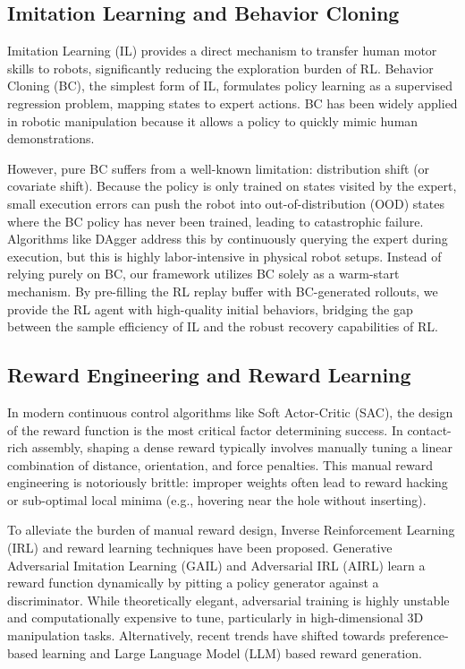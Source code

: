 \documentclass[conference]{IEEEtran}
\begin{document}
\subsection{Imitation Learning and Behavior Cloning}
Imitation Learning (IL) provides a direct mechanism to transfer human motor skills to robots, significantly reducing the exploration burden of RL. Behavior Cloning (BC), the simplest form of IL, formulates policy learning as a supervised regression problem, mapping states to expert actions. BC has been widely applied in robotic manipulation because it allows a policy to quickly mimic human demonstrations.

However, pure BC suffers from a well-known limitation: distribution shift (or covariate shift). Because the policy is only trained on states visited by the expert, small execution errors can push the robot into out-of-distribution (OOD) states where the BC policy has never been trained, leading to catastrophic failure. Algorithms like DAgger address this by continuously querying the expert during execution, but this is highly labor-intensive in physical robot setups. Instead of relying purely on BC, our framework utilizes BC solely as a warm-start mechanism. By pre-filling the RL replay buffer with BC-generated rollouts, we provide the RL agent with high-quality initial behaviors, bridging the gap between the sample efficiency of IL and the robust recovery capabilities of RL.

\subsection{Reward Engineering and Reward Learning}
In modern continuous control algorithms like Soft Actor-Critic (SAC), the design of the reward function is the most critical factor determining success. In contact-rich assembly, shaping a dense reward typically involves manually tuning a linear combination of distance, orientation, and force penalties. This manual reward engineering is notoriously brittle: improper weights often lead to reward hacking or sub-optimal local minima (e.g., hovering near the hole without inserting).

To alleviate the burden of manual reward design, Inverse Reinforcement Learning (IRL) and reward learning techniques have been proposed. Generative Adversarial Imitation Learning (GAIL) and Adversarial IRL (AIRL) learn a reward function dynamically by pitting a policy generator against a discriminator. While theoretically elegant, adversarial training is highly unstable and computationally expensive to tune, particularly in high-dimensional 3D manipulation tasks. Alternatively, recent trends have shifted towards preference-based learning and Large Language Model (LLM) based reward generation.
\end{document}
